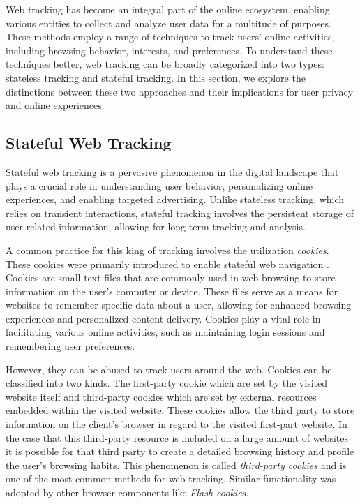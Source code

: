 Web tracking has become an integral part of the online ecosystem, enabling various 
entities to collect and analyze user data for a multitude of purposes. These methods
employ a range of techniques to track users' online activities, including browsing behavior,
interests, and preferences. To understand these techniques better, web tracking can be broadly
categorized into two types: stateless tracking and stateful tracking. In this section, we explore
the distinctions between these two approaches and their implications for user privacy and online experiences.

\subsection{Stateful Web Tracking}
Stateful web tracking is a pervasive phenomenon in the digital landscape that plays a crucial role in understanding user behavior,
personalizing online experiences, and enabling targeted advertising. Unlike stateless tracking, which relies on transient interactions,
stateful tracking involves the persistent storage of user-related information, allowing for long-term tracking and analysis. 

A common practice for this king of tracking involves the utilization \emph{cookies}. These cookies were primarily introduced to enable 
stateful web navigation \cite{jschwartz}. Cookies are small text files that are commonly used in web browsing to store information
on the user's computer or device. These files serve as a means for websites to remember specific data about a user,
allowing for enhanced browsing experiences and personalized content delivery. Cookies play a vital role in facilitating
various online activities, such as maintaining login sessions and remembering user preferences.

However, they can be abused to track users around the web. Cookies can be classified into two kinds.
The first-party cookie which are set by the visited website itself and third-party cookies which are set by external 
resources embedded within the visited website. These cookies allow the third party to store information on the client's browser in regard 
to the visited first-part website. In the case that this third-party resource is included on a large amount of websites it is possible 
for that third party to create a detailed browsing history and profile the user's browsing habits. This phenomenon is called \emph{third-party cookies}
and is one of the most common methods for web tracking. Similar functionality was adopted by other browser components like
\emph{Flash cookies}. 

